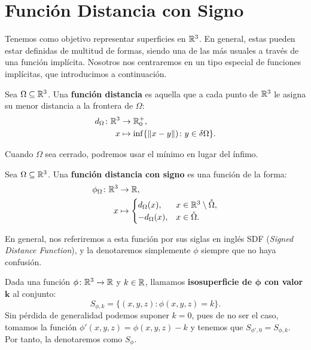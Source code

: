 \chapter{Función Distancia con Signo}
Tenemos como objetivo representar superficies en $\mathbb{R}^3$. En general, estas pueden estar definidas de multitud de formas, siendo una de las más usuales a través de una función implícita. Nosotros nos centraremos en un tipo especial de funciones implícitas, que introducimos a continuación.

\begin{definicion}\label{def:sdf}
  Sea $\Omega \subseteq \mathbb{R}^3$. Una \textbf{función distancia} es aquella que a cada punto de $\mathbb{R}^3$ le asigna su menor distancia a la frontera de $\Omega$:
    \begin{align*}
          d_{\Omega} \colon \mathbb{R}^3 &\to \mathbb{R}_0^+,\\
          x &\mapsto \inf\{\Vert x-y\Vert) \colon y \in \delta\Omega\}.
    \end{align*}

    Cuando $\Omega$ sea cerrado, podremos usar el mínimo en lugar del ínfimo.
\end{definicion}
 
\begin{definicion}[SDF]\label{d:sdf}
  Sea $\Omega \subseteq \mathbb{R}^3$. Una \textbf{función distancia con signo} es una función de la forma:
  \begin{align*}
          \phi_{\Omega} \colon \mathbb{R}^3 &\to \mathbb{R},\\
          x &\mapsto \begin{cases}
      d_{\Omega}(x),  &x\in \mathbb{R}^3\setminus \mathring{\Omega}, \\
      -d_{\Omega}(x), &x\in \mathring{\Omega}.
    \end{cases}
    \end{align*}

  En general, nos referiremos a esta función por sus siglas en inglés SDF (\textit{Signed Distance Function}), y la denotaremos simplemente $\phi$ siempre que no haya confusión.
\end{definicion}

\begin{definicion}
  Dada una función $\phi\colon \mathbb{R}^3 \to \mathbb{R}$ y $k\in\mathbb{R}$, llamamos \textbf{isosuperficie de $\boldsymbol{\phi}$ con valor $\boldsymbol{k}$} al conjunto:
  \begin{equation*}
      S_{\phi,k} = \{(x,y,z) :  \phi(x,y,z)=k\}.
  \end{equation*}
  Sin pérdida de generalidad podemos suponer $k=0$, pues de no ser el caso, tomamos la función $\phi'(x,y,z)=\phi(x,y,z)-k$ y tenemos que $S_{\phi',0} = S_{\phi,k}$. Por tanto, la denotaremos como $S_\phi$.
\end{definicion}

